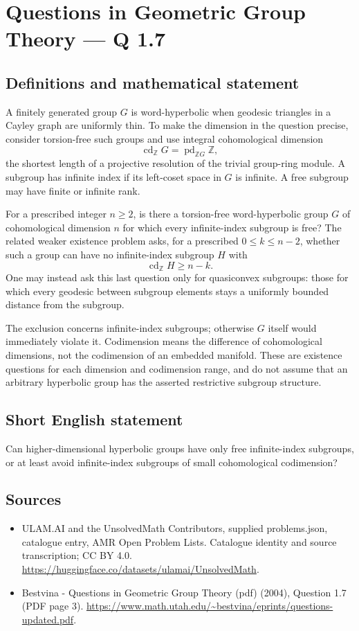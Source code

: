\documentclass[11pt,a4paper]{article}
\begin{document}
\section*{Questions in Geometric Group Theory — Q 1.7}\label{statement}

\subsection{Definitions and mathematical statement}
A finitely generated group $G$ is word-hyperbolic when geodesic triangles in a Cayley graph are uniformly thin. To make the dimension in the question precise, consider torsion-free such groups and use integral cohomological dimension
\[
 \operatorname{cd}_{\mathbb Z}G
 =\operatorname{pd}_{\mathbb ZG}\mathbb Z,
\]
the shortest length of a projective resolution of the trivial group-ring module. A subgroup has infinite index if its left-coset space in $G$ is infinite. A free subgroup may have finite or infinite rank.

For a prescribed integer $n\geq2$, is there a torsion-free word-hyperbolic group $G$ of cohomological dimension $n$ for which every infinite-index subgroup is free? The related weaker existence problem asks, for a prescribed $0\leq k\leq n-2$, whether such a group can have no infinite-index subgroup $H$ with
\[
 \operatorname{cd}_{\mathbb Z}H\geq n-k.
\]
One may instead ask this last question only for quasiconvex subgroups: those for which every geodesic between subgroup elements stays a uniformly bounded distance from the subgroup.

The exclusion concerns infinite-index subgroups; otherwise $G$ itself would immediately violate it. Codimension means the difference of cohomological dimensions, not the codimension of an embedded manifold. These are existence questions for each dimension and codimension range, and do not assume that an arbitrary hyperbolic group has the asserted restrictive subgroup structure.
\subsection{Short English statement}
Can higher-dimensional hyperbolic groups have only free infinite-index subgroups, or at least avoid infinite-index subgroups of small cohomological codimension?
\subsection{Sources}
\begin{itemize}
\item[S1] ULAM.AI and the UnsolvedMath Contributors, supplied problems.json, catalogue entry, AMR Open Problem Lists. Catalogue identity and source transcription; CC BY 4.0.
\url{https://huggingface.co/datasets/ulamai/UnsolvedMath}.
\item[S2] Bestvina - Questions in Geometric Group Theory (pdf) (2004), Question 1.7 (PDF page 3). 
\url{https://www.math.utah.edu/~bestvina/eprints/questions-updated.pdf}.
\end{itemize}
\end{document}
